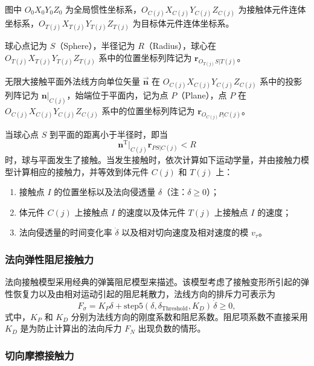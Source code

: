 图中 $O_0 X_0 Y_0 Z_0$ 为全局惯性坐标系，$O_{C(j)} X_{C(j)} Y_{C(j)} Z_{C(j)}$ 为接触体元件连体坐标系，$O_{T(j)} X_{T(j)} Y_{T(j)} Z_{T(j)}$ 为目标体元件连体坐标系。

球心点记为 $S$（Sphere），半径记为 $R$（Radius），球心在 $O_{T(j)} X_{T(j)} Y_{T(j)} Z_{T(j)}$ 系中的位置坐标列阵记为 $\boldsymbol{r}_{O_{T(j)}S|T(j)}$。

无限大接触平面外法线方向单位矢量 $\vec{\boldsymbol{n}}$ 在 $O_{C(j)} X_{C(j)} Y_{C(j)} Z_{C(j)}$ 系中的投影列阵记为 $\boldsymbol{n}|_{C(j)}$，始端位于平面内，记为点 $P$（Plane），点 $P$ 在 $O_{C(j)} X_{C(j)} Y_{C(j)} Z_{C(j)}$ 系中的位置坐标列阵记为 $\boldsymbol{r}_{O_{C(j)}P|C(j)}$。

当球心点 $S$ 到平面的距离小于半径时，即当
\begin{equation}\label{eq:11.72}
\boldsymbol{n}^{\mathrm{T}}|_{C(j)} \boldsymbol{r}_{PS|C(j)} < R
\end{equation}
时，球与平面发生了接触。当发生接触时，依次计算如下运动学量，并由接触力模型计算相应的接触力，并等效到体元件 $C(j)$ 和 $T(j)$ 上：
\begin{enumerate}
\item 接触点 $I$ 的位置坐标以及法向侵透量 $\delta$（注：$\delta \geq 0$）；
\item 体元件 $C(j)$ 上接触点 $I$ 的速度以及体元件 $T(j)$ 上接触点 $I$ 的速度；
\item 法向侵透量的时间变化率 $\dot{\delta}$ 以及相对切向速度及相对速度的模 $v_{\tau}$。
\end{enumerate}

\subsubsection{法向弹性阻尼接触力}

法向接触模型采用经典的弹簧阻尼模型来描述。该模型考虑了接触变形所引起的弹性恢复力以及由相对运动引起的阻尼耗散力，法线方向的排斥力可表示为
\begin{equation}\label{eq:11.73}
F_{\sigma} = K_P \delta + \mathrm{step5}(\delta, \delta_{\text{Threshold}}, K_D) \, \dot{\delta} \geq 0,
\end{equation}
式中，$K_P$ 和 $K_D$ 分别为法线方向的刚度系数和阻尼系数。阻尼项系数不直接采用 $K_D$ 是为防止计算出的法向斥力 $F_N$ 出现负数的情形。

\subsubsection{切向摩擦接触力}

